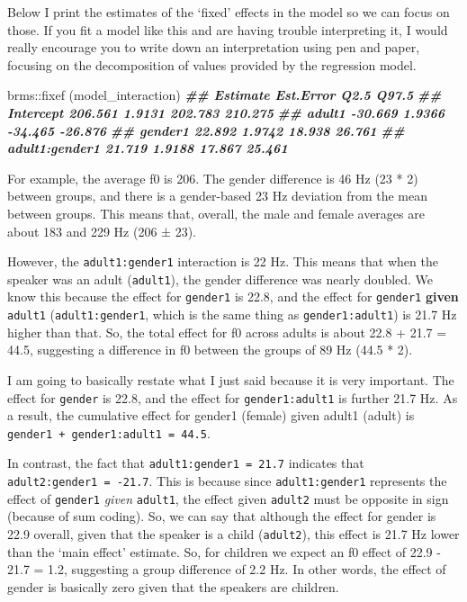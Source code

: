 \documentclass[
]{book}
\newenvironment{Shaded}{\begin{snugshade}}{\end{snugshade}}
\newcommand{\DocumentationTok}[1]{\textcolor[rgb]{0.56,0.35,0.01}{\textbf{\textit{#1}}}}
\newcommand{\FunctionTok}[1]{\textcolor[rgb]{0.00,0.00,0.00}{#1}}
\newcommand{\NormalTok}[1]{#1}
\newcommand{\SpecialCharTok}[1]{\textcolor[rgb]{0.00,0.00,0.00}{#1}}
\begin{document}
Below I print the estimates of the `fixed' effects in the model so we can focus on those. If you fit a model like this and are having trouble interpreting it, I would really encourage you to write down an interpretation using pen and paper, focusing on the decomposition of values provided by the regression model.

\begin{Shaded}
\begin{Highlighting}[]
\NormalTok{brms}\SpecialCharTok{::}\FunctionTok{fixef}\NormalTok{ (model\_interaction)}
\DocumentationTok{\#\#                Estimate Est.Error    Q2.5   Q97.5}
\DocumentationTok{\#\# Intercept       206.561    1.9131 202.783 210.275}
\DocumentationTok{\#\# adult1          {-}30.669    1.9366 {-}34.465 {-}26.876}
\DocumentationTok{\#\# gender1          22.892    1.9742  18.938  26.761}
\DocumentationTok{\#\# adult1:gender1   21.719    1.9188  17.867  25.461}
\end{Highlighting}
\end{Shaded}

For example, the average f0 is 206. The gender difference is 46 Hz (23 * 2) between groups, and there is a gender-based 23 Hz deviation from the mean between groups. This means that, overall, the male and female averages are about 183 and 229 Hz (206 ± 23).

However, the \texttt{adult1:gender1} interaction is 22 Hz. This means that when the speaker was an adult (\texttt{adult1}), the gender difference was nearly doubled. We know this because the effect for \texttt{gender1} is 22.8, and the effect for \texttt{gender1} \textbf{given} \texttt{adult1} (\texttt{adult1:gender1}, which is the same thing as \texttt{gender1:adult1}) is 21.7 Hz higher than that. So, the total effect for f0 across adults is about 22.8 + 21.7 = 44.5, suggesting a difference in f0 between the groups of 89 Hz (44.5 * 2).

I am going to basically restate what I just said because it is very important. The effect for \texttt{gender} is 22.8, and the effect for \texttt{gender1:adult1} is further 21.7 Hz. As a result, the cumulative effect for gender1 (female) given adult1 (adult) is \texttt{gender1\ +\ gender1:adult1\ =\ 44.5}.

In contrast, the fact that \texttt{adult1:gender1\ =\ 21.7} indicates that \texttt{adult2:gender1\ =\ -21.7}. This is because since \texttt{adult1:gender1} represents the effect of \texttt{gender1} \emph{given} \texttt{adult1}, the effect given \texttt{adult2} must be opposite in sign (because of sum coding). So, we can say that although the effect for gender is 22.9 overall, given that the speaker is a child (\texttt{adult2}), this effect is 21.7 Hz lower than the `main effect' estimate. So, for children we expect an f0 effect of 22.9 - 21.7 = 1.2, suggesting a group difference of 2.2 Hz. In other words, the effect of gender is basically zero given that the speakers are children.
\end{document}
